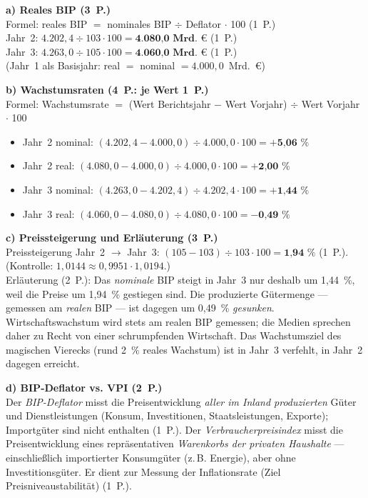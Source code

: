 \begin{loesung}[title={Lösung Aufgabe~2.7 --- Nominales und reales Wachstum}]
\textbf{a) Reales BIP (3~P.)}\\
Formel: reales BIP $=$ nominales BIP $\div$ Deflator $\cdot$ 100 (1~P.)\\
Jahr~2: $4.202{,}4 \div 103 \cdot 100 = \textbf{4.080,0~Mrd.~€}$ (1~P.)\\
Jahr~3: $4.263{,}0 \div 105 \cdot 100 = \textbf{4.060,0~Mrd.~€}$ (1~P.)\\
(Jahr~1 als Basisjahr: real $=$ nominal $= 4.000{,}0$~Mrd.~€)

\textbf{b) Wachstumsraten (4~P.: je Wert 1~P.)}\\
Formel: Wachstumsrate $=$ (Wert Berichtsjahr $-$ Wert Vorjahr) $\div$ Wert Vorjahr $\cdot$ 100
\begin{itemize}
  \item Jahr~2 nominal: $(4.202{,}4 - 4.000{,}0) \div 4.000{,}0 \cdot 100 = \textbf{+5,06~\%}$
  \item Jahr~2 real: $(4.080{,}0 - 4.000{,}0) \div 4.000{,}0 \cdot 100 = \textbf{+2,00~\%}$
  \item Jahr~3 nominal: $(4.263{,}0 - 4.202{,}4) \div 4.202{,}4 \cdot 100 = \textbf{+1,44~\%}$
  \item Jahr~3 real: $(4.060{,}0 - 4.080{,}0) \div 4.080{,}0 \cdot 100 = \textbf{$-$0,49~\%}$
\end{itemize}

\textbf{c) Preissteigerung und Erläuterung (3~P.)}\\
Preissteigerung Jahr~2 $\rightarrow$ Jahr~3: $(105 - 103) \div 103 \cdot 100 =
\textbf{1,94~\%}$ (1~P.). (Kontrolle: $1{,}0144 \approx 0{,}9951 \cdot 1{,}0194$.)\\
Erläuterung (2~P.): Das \emph{nominale} BIP steigt in Jahr~3 nur deshalb um 1,44~\%, weil
die Preise um 1,94~\% gestiegen sind. Die produzierte Gütermenge --- gemessen am
\emph{realen} BIP --- ist dagegen um 0,49~\% \emph{gesunken}. Wirtschaftswachstum wird
stets am realen BIP gemessen; die Medien sprechen daher zu Recht von einer schrumpfenden
Wirtschaft. Das Wachstumsziel des magischen Vierecks (rund 2~\% reales Wachstum) ist in
Jahr~3 verfehlt, in Jahr~2 dagegen erreicht.

\textbf{d) BIP-Deflator vs. VPI (2~P.)}\\
Der \emph{BIP-Deflator} misst die Preisentwicklung \emph{aller im Inland produzierten}
Güter und Dienstleistungen (Konsum, Investitionen, Staatsleistungen, Exporte);
Importgüter sind nicht enthalten (1~P.). Der \emph{Verbraucherpreisindex} misst die
Preisentwicklung eines repräsentativen \emph{Warenkorbs der privaten Haushalte} ---
einschließlich importierter Konsumgüter (z.\,B. Energie), aber ohne Investitionsgüter.
Er dient zur Messung der Inflationsrate (Ziel Preisniveaustabilität) (1~P.).
\end{loesung}

